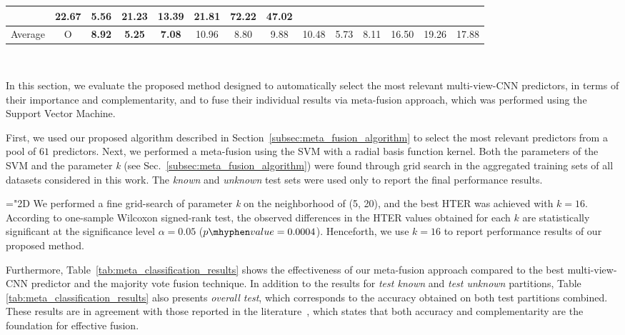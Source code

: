 \begin{table*}[!hb]
\begin{tabular}{cc||c|c|c||c|c|c||c|c|c||c|c|c}
												 & \multirow{-2}{*}{22.67}
												 & \multirow{-2}{*}{5.56}
												 & \multirow{-2}{*}{21.23}
												 & \multirow{-2}{*}{13.39}
												 & \multirow{-2}{*}{21.81}
												 & \multirow{-2}{*}{72.22}
												 & \multirow{-2}{*}{47.02} \\
    \hline
    \hline
    Average						& O    &\bf 8.92 &\bf 5.25 &\bf 7.08 & 10.96   & 8.80   & 9.88   & 10.48    & 5.73  & 8.11  & 16.50	& 19.26	  & 17.88     \\
    \bottomrule
\end{tabular}\\
\label{tab:meta_classification_results}
\end{table*}


In this section, we evaluate the proposed method designed to automatically select the most relevant multi-view-CNN predictors, in terms of their importance and complementarity, and to fuse their individual results via meta-fusion approach, which was performed using the Support Vector Machine.

First, we used our proposed algorithm described in Section~\ref{subsec:meta_fusion_algorithm} to select the most relevant predictors from a pool of $61$ predictors. Next, we performed a meta-fusion using the SVM with a radial basis function kernel. Both the parameters of the SVM and the parameter \textit{k} (see Sec.~\ref{subsec:meta_fusion_algorithm}) were found through grid search in the aggregated training sets of all datasets considered in this work. The \emph{known} and \emph{unknown} test sets were used only to report the final performance results.

\mathchardef\mhyphen="2D  %
We performed a fine grid-search of parameter \textit{k} on the neighborhood of (5, 20), and the best HTER was achieved with $k=16$.
According to one-sample Wilcoxon signed-rank test, the observed differences in the HTER values obtained for each $k$ are statistically significant at the significance level $\alpha=0.05$ ($p\mhyphen value=0.0004$). Henceforth, we use $k=16$ to report performance results of our proposed method.

Furthermore, Table~\ref{tab:meta_classification_results} shows the effectiveness of our meta-fusion approach compared to the best multi-view-CNN predictor and the majority vote fusion technique. In addition to the results for \emph{test known} and \emph{test unknown} partitions, Table \ref{tab:meta_classification_results} also presents \emph{overall test}, which corresponds to the accuracy obtained on both test partitions combined. These results are in agreement with those reported in the literature~\cite{kuncheva2014}, which states that both accuracy and complementarity are the foundation for effective fusion.

